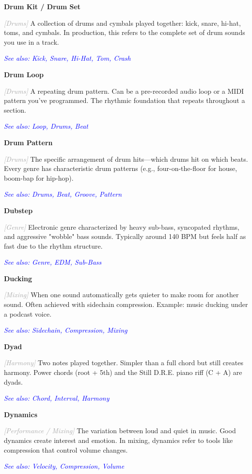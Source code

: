 \documentclass[11pt,letterpaper]{article}
\newcommand{\term}[1]{\textbf{\large\color{purple}#1}}
\newcommand{\category}[1]{\textcolor{darkgray}{\textit{\small [#1]}}}
\newcommand{\seealso}[1]{\textcolor{blue}{\textit{See also: #1}}}
\newenvironment{termdef}[1]
  {\noindent\term{#1}\par\nopagebreak}
  {\par\vspace{0.3em}}
\begin{document}
\begin{termdef}{Drum Kit / Drum Set}
\category{Drums}
A collection of drums and cymbals played together: kick, snare, hi-hat, toms, and cymbals. In production, this refers to the complete set of drum sounds you use in a track.

\seealso{Kick, Snare, Hi-Hat, Tom, Crash}
\end{termdef}

\begin{termdef}{Drum Loop}
\category{Drums}
A repeating drum pattern. Can be a pre-recorded audio loop or a MIDI pattern you've programmed. The rhythmic foundation that repeats throughout a section.

\seealso{Loop, Drums, Beat}
\end{termdef}

\begin{termdef}{Drum Pattern}
\category{Drums}
The specific arrangement of drum hits—which drums hit on which beats. Every genre has characteristic drum patterns (e.g., four-on-the-floor for house, boom-bap for hip-hop).

\seealso{Drums, Beat, Groove, Pattern}
\end{termdef}

\begin{termdef}{Dubstep}
\category{Genre}
Electronic genre characterized by heavy sub-bass, syncopated rhythms, and aggressive "wobble" bass sounds. Typically around 140 BPM but feels half as fast due to the rhythm structure.

\seealso{Genre, EDM, Sub-Bass}
\end{termdef}

\begin{termdef}{Ducking}
\category{Mixing}
When one sound automatically gets quieter to make room for another sound. Often achieved with sidechain compression. Example: music ducking under a podcast voice.

\seealso{Sidechain, Compression, Mixing}
\end{termdef}

\begin{termdef}{Dyad}
\category{Harmony}
Two notes played together. Simpler than a full chord but still creates harmony. Power chords (root + 5th) and the Still D.R.E. piano riff (C + A) are dyads.

\seealso{Chord, Interval, Harmony}
\end{termdef}

\begin{termdef}{Dynamics}
\category{Performance / Mixing}
The variation between loud and quiet in music. Good dynamics create interest and emotion. In mixing, dynamics refer to tools like compression that control volume changes.

\seealso{Velocity, Compression, Volume}
\end{termdef}
\end{document}
